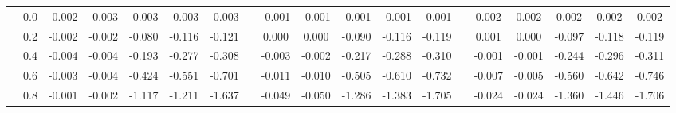\begin{table}
{\begin{tabular}{llccccccccccccccccc}
 & 0.0 & \cellcolor[HTML]{79B1D3}-0.002 & \cellcolor[HTML]{79B1D3}-0.003 & \cellcolor[HTML]{79B1D3}-0.003 & \cellcolor[HTML]{79B1D3}-0.003 & \cellcolor[HTML]{79B1D3}-0.003 & & \cellcolor[HTML]{76AFD2}-0.001 & \cellcolor[HTML]{76AED2}-0.001 & \cellcolor[HTML]{76AFD2}-0.001 & \cellcolor[HTML]{76AFD2}-0.001 & \cellcolor[HTML]{77AFD2}-0.001 & & \cellcolor[HTML]{77AFD2}0.002 & \cellcolor[HTML]{77AFD2}0.002 & \cellcolor[HTML]{77AFD2}0.002 & \cellcolor[HTML]{77AFD2}0.002 & \cellcolor[HTML]{77AFD2}0.002 \\
 & 0.2 & \cellcolor[HTML]{77B0D2}-0.002 & \cellcolor[HTML]{79B1D3}-0.002 & \cellcolor[HTML]{CAE8F2}-0.080 & \cellcolor[HTML]{DCF1F7}-0.116 & \cellcolor[HTML]{DEF2F7}-0.121 & & \cellcolor[HTML]{74ADD1}0.000 & \cellcolor[HTML]{74ADD1}0.000 & \cellcolor[HTML]{CEEAF3}-0.090 & \cellcolor[HTML]{DAF0F6}-0.116 & \cellcolor[HTML]{DBF1F7}-0.119 & & \cellcolor[HTML]{75AED2}0.001 & \cellcolor[HTML]{74ADD1}0.000 & \cellcolor[HTML]{D1EBF4}-0.097 & \cellcolor[HTML]{DBF0F6}-0.118 & \cellcolor[HTML]{DBF1F7}-0.119 \\
 & 0.4 & \cellcolor[HTML]{7CB3D4}-0.004 & \cellcolor[HTML]{7CB3D5}-0.004 & \cellcolor[HTML]{F0F8DE}-0.193 & \cellcolor[HTML]{FBFDC7}-0.277 & \cellcolor[HTML]{FEFFC0}-0.308 & & \cellcolor[HTML]{79B1D3}-0.003 & \cellcolor[HTML]{78B0D3}-0.002 & \cellcolor[HTML]{F2F9DA}-0.217 & \cellcolor[HTML]{FBFDC7}-0.288 & \cellcolor[HTML]{FDFEC3}-0.310 & & \cellcolor[HTML]{76AED2}-0.001 & \cellcolor[HTML]{76AED2}-0.001 & \cellcolor[HTML]{F6FBD2}-0.244 & \cellcolor[HTML]{FCFEC6}-0.296 & \cellcolor[HTML]{FEFEC2}-0.311 \\
 & 0.6 & \cellcolor[HTML]{7AB1D3}-0.003 & \cellcolor[HTML]{7CB3D4}-0.004 & \cellcolor[HTML]{FFF4AE}-0.424 & \cellcolor[HTML]{FFEAA0}-0.551 & \cellcolor[HTML]{FEE192}-0.701 & & \cellcolor[HTML]{89BDDA}-0.011 & \cellcolor[HTML]{86BBD9}-0.010 & \cellcolor[HTML]{FFEFA7}-0.505 & \cellcolor[HTML]{FFE89C}-0.610 & \cellcolor[HTML]{FEE192}-0.732 & & \cellcolor[HTML]{80B6D6}-0.007 & \cellcolor[HTML]{7EB5D5}-0.005 & \cellcolor[HTML]{FFEBA1}-0.560 & \cellcolor[HTML]{FFE69A}-0.642 & \cellcolor[HTML]{FEE191}-0.746 \\
 & 0.8 & \cellcolor[HTML]{76AED2}-0.001 & \cellcolor[HTML]{77B0D2}-0.002 & \cellcolor[HTML]{FEC677}-1.117 & \cellcolor[HTML]{FEC172}-1.211 & \cellcolor[HTML]{FDAE61}-1.637 & & \cellcolor[HTML]{B2DCEB}-0.049 & \cellcolor[HTML]{B3DDEB}-0.050 & \cellcolor[HTML]{FEC071}-1.286 & \cellcolor[HTML]{FEBB6D}-1.383 & \cellcolor[HTML]{FDAE61}-1.705 & & \cellcolor[HTML]{9ACAE1}-0.024 & \cellcolor[HTML]{9ACBE1}-0.024 & \cellcolor[HTML]{FEBC6E}-1.360 & \cellcolor[HTML]{FEB86B}-1.446 & \cellcolor[HTML]{FDAE61}-1.706 \\

\end{tabular}}
\end{table}
